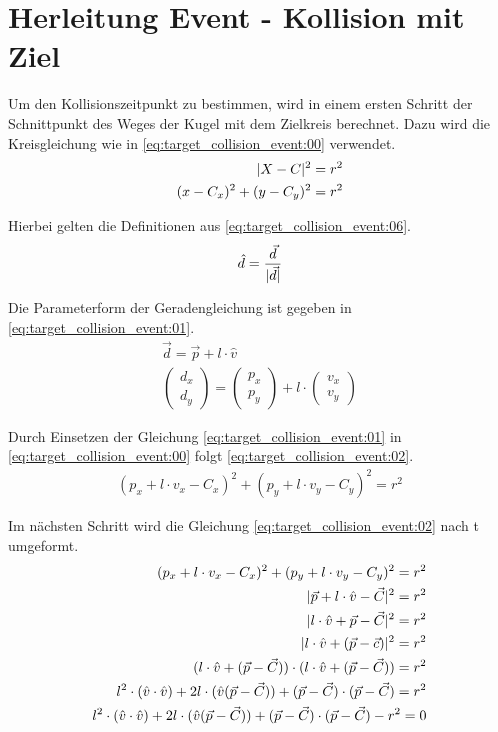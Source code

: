 \section{Herleitung Event - Kollision mit Ziel}\label{anhang:herleitung:event:targetCollision}
Um den Kollisionszeitpunkt zu bestimmen, wird in einem ersten Schritt der Schnittpunkt des Weges der Kugel mit
dem Zielkreis berechnet. Dazu wird die Kreisgleichung wie in \ref{eq:target_collision_event:00} verwendet.
\begin{align}
    \lvert X - C \rvert^2 = r^2\\
    (x - C_x)^2 + (y - C_y)^2 = r^2\label{eq:target_collision_event:00}
\end{align}

Hierbei gelten die Definitionen aus \ref{eq:target_collision_event:06}.
\begin{align}
    \hat{d} = \frac{\vec{d}}{\lvert \vec{d} \rvert}
\end{align}

Die Parameterform der Geradengleichung ist gegeben in \ref{eq:target_collision_event:01}.
\begin{align}
    \vec{d} = \vec{p} + l \cdot \hat{v}\\
    \begin{pmatrix}d_{x}\\d_{y}\end{pmatrix} = \begin{pmatrix}p_{x}\\p_{y}\end{pmatrix} + l \cdot \begin{pmatrix}v_{x}\\v_{y}\end{pmatrix}\label{eq:target_collision_event:01}
\end{align}

Durch Einsetzen der Gleichung \ref{eq:target_collision_event:01} in \ref{eq:target_collision_event:00} folgt \ref{eq:target_collision_event:02}.
\begin{align}
    (p_x + l \cdot v_x - C_x)^2 + (p_y + l \cdot v_y - C_y)^2 = r^2\label{eq:target_collision_event:02}
\end{align}

Im nächsten Schritt wird die Gleichung \ref{eq:target_collision_event:02} nach t umgeformt.
\begin{align}
    (p_x + l \cdot v_x - C_x)^2 + (p_y + l \cdot v_y - C_y)^2 = r^2\\
    \lvert \vec{p} + l \cdot \hat{v} - \vec{C} \rvert^2 = r^2\\
    \lvert l \cdot \hat{v} + \vec{p} - \vec{C} \rvert^2 = r^2\\
    \lvert l \cdot \hat{v} + (\vec{p} - \vec{c}) \rvert^2 = r^2\\
    (l \cdot \hat{v} + (\vec{p} - \vec{C})) \cdot (l \cdot \hat{v} + (\vec{p} - \vec{C})) = r^2\\
    l^2 \cdot (\hat{v} \cdot \hat{v}) + 2l \cdot (\hat{v}(\vec{p} - \vec{C})) + (\vec{p} - \vec{C}) \cdot (\vec{p} - \vec{C}) = r^2\\
    l^2 \cdot (\hat{v} \cdot \hat{v}) + 2l \cdot (\hat{v}(\vec{p} - \vec{C})) + (\vec{p} - \vec{C}) \cdot (\vec{p} - \vec{C}) - r^2 = 0\label{eq:target_collision_event:03}
\end{align}

